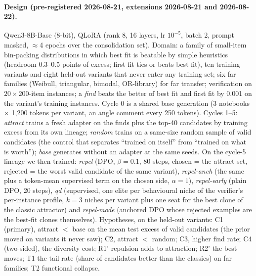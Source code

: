 \documentclass[11pt]{article}
\begin{document}
\paragraph{Design (pre-registered 2026-08-21, extensions 2026-08-21 and 2026-08-22).}
Qwen3-8B-Base (8-bit), QLoRA (rank 8, 16 layers, lr $10^{-5}$, batch 2,
prompt masked, $\approx$4 epochs over the consolidation set). Domain: a
family of small-item bin-packing distributions in which best fit is
beatable by simple heuristics (headroom 0.3--0.5 points of excess; first fit
ties or beats best fit), ten training variants and eight held-out variants
that never enter any training set; six far families (Weibull, triangular,
bimodal, OR-library) for far transfer; verification on $20\times200$-item
instances; a \emph{find} beats the better of best fit and first fit by 0.001
on the variant's training instances. Cycle 0 is a shared base generation (3
notebooks $\times$ 1,200 tokens per variant, an angle comment every 250
tokens). Cycles 1--5: \emph{attract} trains a fresh adapter on the finds
plus the top-40 candidates by training excess from its own lineage;
\emph{random} trains on a same-size random sample of valid candidates (the
control that separates ``trained on itself'' from ``trained on what is
worth''); \emph{base} generates without an adapter at the same seeds. On the
cycle-5 lineage we then trained: \emph{repel} (DPO, $\beta=0.1$, 80 steps,
chosen = the attract set, rejected = the worst valid candidate of the same
variant), \emph{repel-anch} (the same plus a token-mean supervised term on
the chosen side, $\alpha=1$), \emph{repel-early} (plain DPO, 20 steps),
\emph{qd} (supervised, one elite per behavioural niche of the verifier's
per-instance profile, $k=3$ niches per variant plus one seat for the best
clone of the classic attractor) and \emph{repel-mode} (anchored DPO whose
rejected examples are the best-fit clones themselves). Hypotheses, on the
held-out variants: C1 (primary), attract $<$ base on the mean test excess of
valid candidates (the prior moved on variants it never saw); C2, attract
$<$ random; C3, higher find rate; C4 (two-sided), the diversity cost; R1'
repulsion adds to attraction; R2' the best moves; T1 the tail rate (share of
candidates better than the classics) on far families; T2 functional
collapse.
\end{document}
